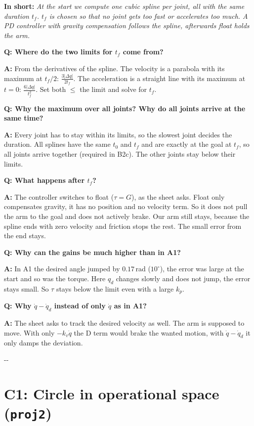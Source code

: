 \documentclass[10pt,a4paper]{article}
\makeatletter
\newcommand{\secneed}[1]{\par\penalty\@M\begingroup\setlength{\dimen@}{#1}\dimen@ii\pagegoal
  \advance\dimen@ii-\pagetotal\ifdim\dimen@>\dimen@ii\ifdim\dimen@ii>\z@\vfil\fi\penalty-\@M\fi\endgroup}
\let\oldsection\section
\renewcommand{\section}{\secneed{9\baselineskip}\oldsection}
\newcommand{\frage}[2]{\textbf{Q: #1}\par\nopagebreak\vspace{1pt}\textbf{A:} #2\par\vspace{5pt}}
\newcommand{\sagen}[1]{\textbf{In short:} \emph{#1}\par}
\newcommand{\code}[1]{\texttt{#1}}
\makeatother
\begin{document}
\sagen{At the start we compute one cubic spline per joint, all with the same duration $t_f$. $t_f$ is chosen so that no
joint gets too fast or accelerates too much. A PD controller with gravity compensation follows the spline, afterwards
float holds the arm.}

\begin{fragen}
\frage{Where do the two limits for $t_f$ come from?}
{From the derivatives of the spline. The velocity is a parabola with its maximum at $t_f/2$:
$\frac{3|\Delta q|}{2t_f}$. The acceleration is a straight line with its maximum at $t = 0$: $\frac{6|\Delta q|}{t_f^2}$.
Set both $\le$ the limit and solve for $t_f$.}
\frage{Why the maximum over all joints? Why do all joints arrive at the same time?}
{Every joint has to stay within its limits, so the slowest joint decides the duration. All splines have the same $t_0$
and $t_f$ and are exactly at the goal at $t_f$, so all joints arrive together (required in B2c). The other joints stay
below their limits.}
\frage{What happens after $t_f$?}
{The controller switches to float ($\tau = G$), as the sheet asks. Float only compensates gravity, it has no position and no velocity term. So it does not pull the arm to the goal and does not actively brake. Our arm still stays, because the spline ends with zero velocity and friction stops the rest. The small error from the end stays.}
\frage{Why can the gains be much higher than in A1?}
{In A1 the desired angle jumped by $0.17$\,rad ($10^\circ$), the error was large at the start and so was the torque.
Here $q_d$ changes slowly and does not jump, the error stays small. So $\tau$ stays below the limit even with a large
$k_p$.}
\frage{Why $\dot q - \dot q_d$ instead of only $\dot q$ as in A1?}
{The sheet asks to track the desired velocity as well. The arm is supposed to move. With only $-k_v\dot q$ the D term
would brake the wanted motion, with $\dot q - \dot q_d$ it only damps the deviation.}
\end{fragen}

\section{C1: Circle in operational space (\code{proj2})}
\end{document}

